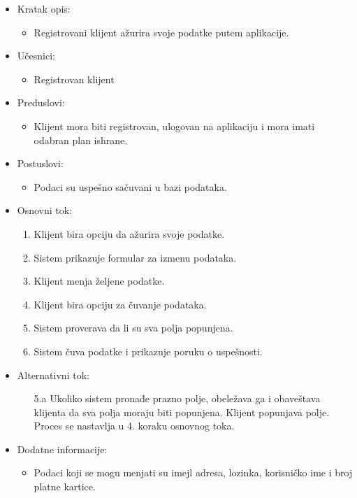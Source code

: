 
\begin{itemize}
    \item Kratak opis:
        \begin{itemize}
            \item Registrovani klijent ažurira svoje podatke putem aplikacije.
        \end{itemize}
    \item Učesnici:
        \begin{itemize}
            \item Registrovan klijent
        \end{itemize}
    \item Preduslovi:
        \begin{itemize}
            \item Klijent mora biti registrovan, ulogovan na aplikaciju i mora imati odabran plan ishrane.
        \end{itemize}
    \item Postuslovi:
        \begin{itemize}
            \item Podaci su uspešno sačuvani u bazi podataka.
        \end{itemize}
    \item Osnovni tok:
        \begin{enumerate}
            \item Klijent bira opciju da ažurira svoje podatke.
            \item Sistem prikazuje formular za izmenu podataka.
            \item Klijent menja željene podatke. 
            \item Klijent bira opciju za čuvanje podataka.
            \item Sistem proverava da li su sva polja popunjena.
            \item Sistem čuva podatke i prikazuje poruku o uspešnosti.
        \end{enumerate}
    \item Alternativni tok:
        \begin{itemize}
            \item[5.a] Ukoliko sistem pronađe prazno polje, obeležava ga i obaveštava klijenta da sva polja moraju biti popunjena. Klijent popunjava polje. Proces se nastavlja u 4. koraku osnovnog toka.
        \end{itemize}
    \item Dodatne informacije:
        \begin{itemize}
            \item Podaci koji se mogu menjati su imejl adresa, lozinka, korisničko ime i broj platne kartice.
        \end{itemize}
\end{itemize}

